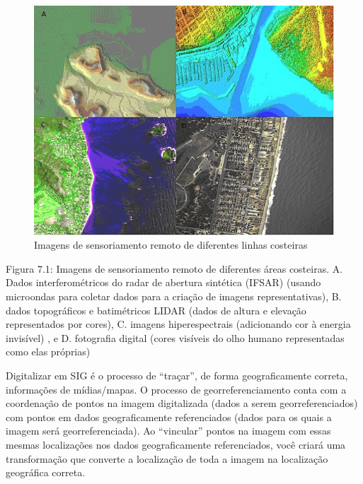 \documentclass[
]{krantz}
\begin{document}
\begin{figure}
\centering
\includegraphics{media/modulo7/rs-images.png}
\caption{Imagens de sensoriamento remoto de diferentes linhas costeiras}
\end{figure}

Figura 7.1: Imagens de sensoriamento remoto de diferentes áreas costeiras. A. Dados interferométricos do radar de abertura sintética (IFSAR) (usando microondas para coletar dados para a criação de imagens representativas), B. dados topográficos e batimétricos LIDAR (dados de altura e elevação representados por cores), C. imagens hiperespectrais (adicionando cor à energia invisível) , e D. fotografia digital (cores visíveis do olho humano representadas como elas próprias)

Digitalizar em SIG é o processo de ``traçar'', de forma geograficamente correta, informações de mídias/mapas. O processo de georreferenciamento conta com a coordenação de pontos na imagem digitalizada (dados a serem georreferenciados) com pontos em dados geograficamente referenciados (dados para os quais a imagem será georreferenciada). Ao ``vincular'' pontos na imagem com essas mesmas localizações nos dados geograficamente referenciados, você criará uma transformação que converte a localização de toda a imagem na localização geográfica correta.
\end{document}
